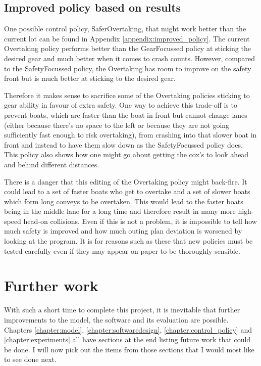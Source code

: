   \subsection{Improved policy based on results}
  One possible control policy, SaferOvertaking, that might work better than the current lot can be found in Appendix \ref{appendix:improved_policy}. The current Overtaking policy performs better than the GearFocussed policy at sticking the desired gear and much better when it comes to crash counts. However, compared to the SafetyFocussed policy, the Overtaking has room to improve on the safety front but is much better at sticking to the desired gear. 
  
  Therefore it makes sense to sacrifice some of the Overtaking policies sticking to gear ability in favour of extra safety. One way to achieve this trade-off is to prevent boats, which are faster than the boat in front but cannot change lanes (either because there's no space to the left or because they are not going sufficiently fast enough to risk overtaking), from crashing into that slower boat in front and instead to have them slow down as the SafetyFocussed policy does. This policy also shows how one might go about getting the cox's to look ahead and behind different distances. 
  
  There is a danger that this editing of the Overtaking policy might back-fire. It could lead to a set of faster boats who get to overtake and a set of slower boats which form long conveys to be overtaken. This would lead to the faster boats being in the middle lane for a long time and therefore result in many more high-speed head-on collisions. Even if this is not a problem, it is impossible to tell how much safety is improved and how much outing plan deviation is worsened by looking at the program. It is for reasons such as these that new policies must be tested carefully even if they may appear on paper to be thoroughly sensible.
  
  \section{Further work}
  With such a short time to complete this project, it is inevitable that further improvements to the model, the software and its evaluation are possible. Chapters \ref{chapter:model}, \ref{chapter:softwaredesign}, \ref{chapter:control_policy} and \ref{chapter:experiments} all have sections at the end listing future work that could be done. I will now pick out the items from those sections that I would most like to see done next.
  
